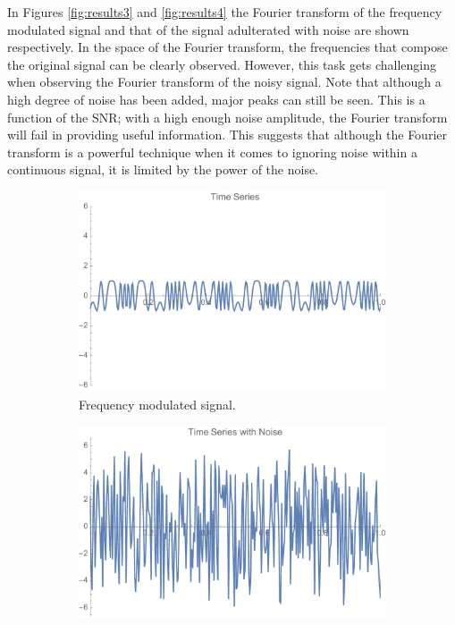 \documentclass[onecolumn, groupedaddress, 10pt]{revtex4-1}
\begin{document}
In Figures \ref{fig:results3} and \ref{fig:results4} the Fourier transform of the frequency modulated signal and that of the signal adulterated with noise are shown respectively. In the space of the Fourier transform, the frequencies that compose the original signal can be clearly observed. However, this task gets challenging when observing the Fourier transform of the noisy signal. Note that although a high degree of noise has been added, major peaks can still be seen. This is a function of the SNR; with a high enough noise amplitude, the Fourier transform will fail in providing useful information. This suggests that although the Fourier transform is a powerful technique when it comes to ignoring noise within a continuous signal, it is limited by the power of the noise.

\begin{figure}[H]
	\centering
	\begin{subfigure}{.5\textwidth}
  		\centering
  		\includegraphics[width=.9\linewidth]{timeSeries.pdf}
  		\caption{\label{fig:results_1}Frequency modulated signal.}
	\end{subfigure}%
	\begin{subfigure}{.5\textwidth}
  		\centering
  		\includegraphics[width=.9\linewidth]{timeSeriesNoise.pdf}

\end{subfigure}
\end{figure}
\end{document}
